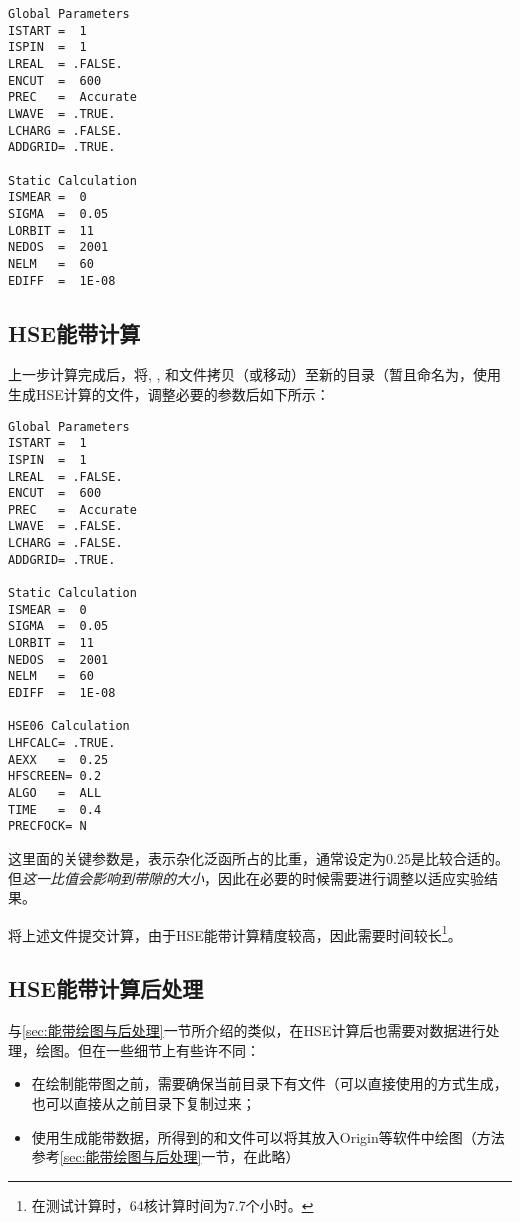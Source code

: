 \begin{lstlisting}[caption=INCAR]
Global Parameters
ISTART =  1
ISPIN  =  1
LREAL  = .FALSE.
ENCUT  =  600   
PREC   =  Accurate
LWAVE  = .TRUE.  
LCHARG = .FALSE.  
ADDGRID= .TRUE.

Static Calculation
ISMEAR =  0       
SIGMA  =  0.05    
LORBIT =  11      
NEDOS  =  2001    
NELM   =  60      
EDIFF  =  1E-08       
\end{lstlisting}

\subsection{HSE能带计算}\label{subsec:HSE能带计算-HSE能带计算}

上一步计算完成后，将, , 和文件拷贝（或移动）至新的目录（暂且命名为，使用生成HSE计算的文件，调整必要的参数后如下所示：

\begin{lstlisting}[caption=INCAR]
Global Parameters
ISTART =  1
ISPIN  =  1
LREAL  = .FALSE.
ENCUT  =  600
PREC   =  Accurate
LWAVE  = .FALSE.
LCHARG = .FALSE.
ADDGRID= .TRUE.
    
Static Calculation
ISMEAR =  0
SIGMA  =  0.05
LORBIT =  11
NEDOS  =  2001
NELM   =  60
EDIFF  =  1E-08
    
HSE06 Calculation
LHFCALC= .TRUE.
AEXX   =  0.25
HFSCREEN= 0.2
ALGO   =  ALL
TIME   =  0.4
PRECFOCK= N
\end{lstlisting}

这里面的关键参数是，表示杂化泛函所占的比重，通常设定为0.25是比较合适的。但\emph{这一比值会影响到带隙的大小}，因此在必要的时候需要进行调整以适应实验结果。

将上述文件提交计算，由于HSE能带计算精度较高，因此需要时间较长\footnote{在测试计算时，64核计算时间为7.7个小时。}。

\subsection{HSE能带计算后处理}\label{subsec:HSE能带计算-HSE能带计算后处理}

与\ref{sec:能带绘图与后处理}一节所介绍的类似，在HSE计算后也需要对数据进行处理，绘图。但在一些细节上有些许不同：

\begin{itemize}
    \item 在绘制能带图之前，需要确保当前目录下有文件（可以直接使用的方式生成，也可以直接从之前目录下复制过来；
    \item 使用生成能带数据，所得到的和文件可以将其放入Origin等软件中绘图（方法参考\ref{sec:能带绘图与后处理}一节，在此略）
\end{itemize}

